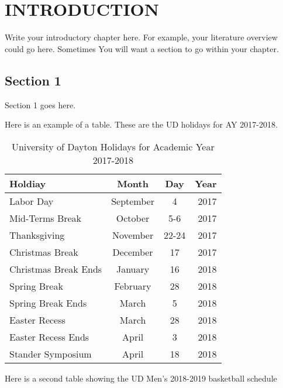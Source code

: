 \chapter{INTRODUCTION}
\label{ch1}

Write your introductory chapter here. For example, your literature
overview could go here. Sometimes You will want a section to go within your chapter.

\section{Section 1}

Section 1 goes here.

Here is an example of a table.  These are the UD holidays for AY 2017-2018.

\begin{table}
    \begin{center}
        \caption{University of Dayton Holidays for Academic Year 2017-2018}
        \label{tab:class}
        \begin{tabular}{||l|c|c|r||}
            \hline
            Holdiay & Month & Day & Year\\
            \hline
            \hline
            Labor Day & September & 4 & 2017 \\
            \hline
            Mid-Terms Break & October & 5-6 & 2017 \\
            \hline
            Thanksgiving & November & 22-24 & 2017 \\
            \hline
            Christmas Break & December & 17 & 2017 \\
            \hline
            Christmas Break Ends & January & 16 & 2018 \\
            \hline
            Spring Break & February & 28 & 2018 \\
            \hline
            Spring Break Ends & March & 5 & 2018 \\
            \hline
            Easter Recess & March & 28 & 2018 \\
            \hline
            Easter Recess Ends & April & 3 & 2018 \\
            \hline
            Stander Symposium & April & 18 & 2018 \\
            \hline
        \end{tabular}
     \end{center}
\end{table}

Here is a second table showing the UD Men's 2018-2019 basketball schedule

